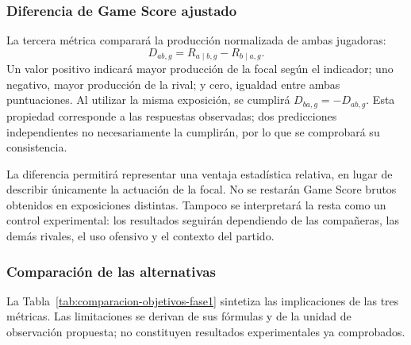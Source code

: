 \subsubsection*{Diferencia de Game Score ajustado}
La tercera métrica comparará la producción normalizada de ambas jugadoras:
\begin{equation}
D_{ab,g}=R_{a\mid b,g}-R_{b\mid a,g}.
\label{eq:diferencia-gmsc-615}
\end{equation}
Un valor positivo indicará mayor producción de la focal según el indicador; uno negativo, mayor producción de la rival; y cero, igualdad entre ambas puntuaciones. Al utilizar la misma exposición, se cumplirá $D_{ba,g}=-D_{ab,g}$. Esta propiedad corresponde a las respuestas observadas; dos predicciones independientes no necesariamente la cumplirán, por lo que se comprobará su consistencia.

La diferencia permitirá representar una ventaja estadística relativa, en lugar de describir únicamente la actuación de la focal. No se restarán Game Score brutos obtenidos en exposiciones distintas. Tampoco se interpretará la resta como un control experimental: los resultados seguirán dependiendo de las compañeras, las demás rivales, el uso ofensivo y el contexto del partido.

\subsubsection*{Comparación de las alternativas}
La Tabla~\ref{tab:comparacion-objetivos-fase1} sintetiza las implicaciones de las tres métricas. Las limitaciones se derivan de sus fórmulas y de la unidad de observación propuesta; no constituyen resultados experimentales ya comprobados.


